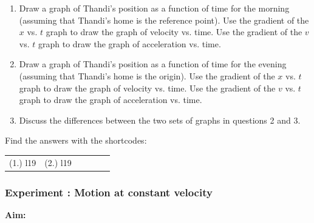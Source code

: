 \begin{enumerate}[noitemsep, label=\textbf{\arabic*}. ]
\begin{enumerate}[noitemsep, label=\textbf{\alph*}. ]
            \label{m38795*uid9523}\item  Draw a graph of Thandi's position as a function of time for the morning (assuming that Thandi's home is the reference point). Use the gradient of the \begin{math}x\end{math} vs. \begin{math}t\end{math} graph to draw the graph of velocity vs. time. Use the gradient of the \begin{math}v\end{math} vs. \begin{math}t\end{math} graph to draw the graph of acceleration vs. time.
\label{m38795*uid99}\item  Draw a graph of Thandi's position as a function of time for the evening (assuming that Thandi's home is the origin). Use the gradient of the \begin{math}x\end{math} vs. \begin{math}t\end{math} graph to draw the graph of velocity vs. time. Use the gradient of the \begin{math}v\end{math} vs. \begin{math}t\end{math} graph to draw the graph of acceleration vs. time.
\label{m38795*uid100}\item Discuss the differences between the two sets of graphs in questions 2 and 3.\end{enumerate}
        
        \end{enumerate}
        
        

\label{m38795*secfhsst!!!underscore!!!id2603}
\par {} Find the answers with the shortcodes:
 \par \begin{tabular}[h]{cccccc}
 (1.) l19  &  (2.) l19  & \end{tabular}



            \subsubsection{ Experiment : Motion at constant velocity }
            \nopagebreak
            \label{m38795*id71268}\noindent{}\textbf{Aim:}
          
